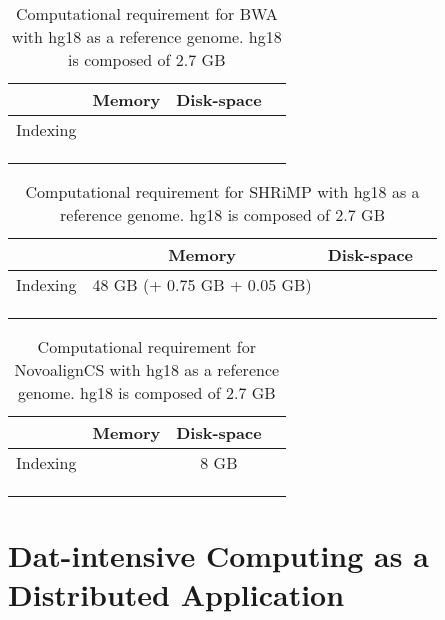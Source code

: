\documentclass{sig-alternate}
\begin{document}
\begin{table}
\begin{tabular}{|c|c|c|c|}  \hline
  & Memory & Disk-space &  \\  \hline 
Indexing  & &  &  \\
  & & &  \\ 
 & & &  \\
 & & &  \\ \hline

\end{tabular} 
\caption{Computational requirement for BWA with hg18 as a reference genome.  hg18 is composed of 2.7 GB}
 \label{comp-req-bwa} 
\end{table}

\begin{table}

\begin{tabular}{|c|c|c|c|}  \hline
  & Memory & Disk-space &  \\  \hline 
Indexing  & 48 GB (+ 0.75 GB + 0.05 GB) & &  \\
  & & &  \\ 
 & & &  \\
 & & &  \\ \hline

\end{tabular} 
\caption{Computational requirement for SHRiMP with hg18 as a reference genome.  hg18 is composed of 2.7 GB}
 \label{comp-req-shrimp} 
\end{table}

\begin{table}

\begin{tabular}{|c|c|c|c|}  \hline
  & Memory & Disk-space &  \\  \hline 
Indexing  &   & 8 GB &  \\
  & & &  \\ 
 & & &  \\
 & & &  \\ \hline

\end{tabular} 
\caption{Computational requirement for NovoalignCS with hg18 as a reference genome.  hg18 is composed of 2.7 GB}
 \label{comp-req-novoCS} 
\end{table}



\section{Dat-intensive Computing as a Distributed Application}
\end{document}
